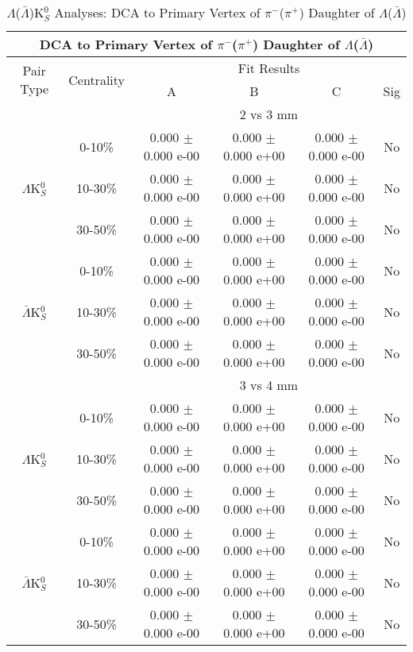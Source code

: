 \documentclass[../AnalysisNoteJBuxton.tex]{subfiles}
\begin{document}
\begin{table}
 \centering
 \begin{tabular}{|c|c|c|c|c|c|}
  \multicolumn{6}{c}{DCA to Primary Vertex of $\pi^{-}$($\pi^{+}$) Daughter of $\Lambda$($\bar{\Lambda}$)} \\
  \hline
  \multirow{2}{*}{Pair Type} & \multirow{2}{*}{Centrality} & \multicolumn{4}{c|}{Fit Results} \\
  \cline{3-6}
   & & A & B & C & Sig \\  
  \hline
  \multicolumn{2}{|c}{} & \multicolumn{4}{c|}{2 vs 3 mm} \\  
  \hline  
  \multirow{3}{*}{$\Lambda$K$^{0}_{S}$}
   &  0-10\% & 0.000 $\pm$ 0.000 e-00 & 0.000 $\pm$ 0.000 e+00 & 0.000 $\pm$ 0.000 e-00 & No \\
   & 10-30\% & 0.000 $\pm$ 0.000 e-00 & 0.000 $\pm$ 0.000 e+00 & 0.000 $\pm$ 0.000 e-00 & No \\
   & 30-50\% & 0.000 $\pm$ 0.000 e-00 & 0.000 $\pm$ 0.000 e+00 & 0.000 $\pm$ 0.000 e-00 & No \\
  \hline
  \multirow{3}{*}{$\bar{\Lambda}$K$^{0}_{S}$}  
   &  0-10\% & 0.000 $\pm$ 0.000 e-00 & 0.000 $\pm$ 0.000 e+00 & 0.000 $\pm$ 0.000 e-00 & No \\
   & 10-30\% & 0.000 $\pm$ 0.000 e-00 & 0.000 $\pm$ 0.000 e+00 & 0.000 $\pm$ 0.000 e-00 & No \\
   & 30-50\% & 0.000 $\pm$ 0.000 e-00 & 0.000 $\pm$ 0.000 e+00 & 0.000 $\pm$ 0.000 e-00 & No \\
  \hline 
  \multicolumn{2}{|c}{} & \multicolumn{4}{c|}{3 vs 4 mm} \\
  \hline  
  \multirow{3}{*}{$\Lambda$K$^{0}_{S}$}   
   &  0-10\% & 0.000 $\pm$ 0.000 e-00 & 0.000 $\pm$ 0.000 e+00 & 0.000 $\pm$ 0.000 e-00 & No \\
   & 10-30\% & 0.000 $\pm$ 0.000 e-00 & 0.000 $\pm$ 0.000 e+00 & 0.000 $\pm$ 0.000 e-00 & No \\
   & 30-50\% & 0.000 $\pm$ 0.000 e-00 & 0.000 $\pm$ 0.000 e+00 & 0.000 $\pm$ 0.000 e-00 & No \\
  \hline  
  \multirow{3}{*}{$\bar{\Lambda}$K$^{0}_{S}$}
   &  0-10\% & 0.000 $\pm$ 0.000 e-00 & 0.000 $\pm$ 0.000 e+00 & 0.000 $\pm$ 0.000 e-00 & No \\
   & 10-30\% & 0.000 $\pm$ 0.000 e-00 & 0.000 $\pm$ 0.000 e+00 & 0.000 $\pm$ 0.000 e-00 & No \\
   & 30-50\% & 0.000 $\pm$ 0.000 e-00 & 0.000 $\pm$ 0.000 e+00 & 0.000 $\pm$ 0.000 e-00 & No \\
  \hline
 \end{tabular}
 \caption{$\Lambda$($\bar{\Lambda}$)K$^{0}_{S}$ Analyses: DCA to Primary Vertex of $\pi^{-}$($\pi^{+}$) Daughter of $\Lambda$($\bar{\Lambda}$)}
 \label{tab:DcaToPrimVertexPionDaughtOfLamLamK0Full}
\end{table}
\end{document}
